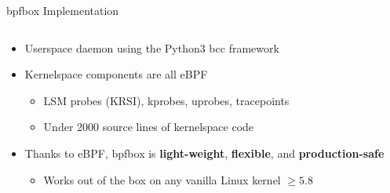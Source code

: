 \documentclass[12pt, dvipsnames, aspectratio=169]{beamer}
\begin{document}



\begin{frame}[c]{bpfbox Implementation}
\begin{columns}
    \begin{column}{0.66\textwidth}
        \begin{itemize}
            \item Userspace daemon using the Python3 bcc framework
            \vspace{2em}
            \item Kernelspace components are all eBPF
            \begin{itemize}
                \item LSM probes (KRSI), kprobes, uprobes, tracepoints
                \item Under 2000 source lines of kernelspace code
            \end{itemize}
            \vspace{2em}
            \item Thanks to eBPF, bpfbox is \textbf{light-weight}, \textbf{flexible}, and \textbf{production-safe}
            \begin{itemize}
                \item Works out of the box on any vanilla Linux kernel $\ge 5.8$
            \end{itemize}
        \end{itemize}
    \end{column}
    \begin{column}{0.33\textwidth}
        \begin{center}
            \color{black}

\end{center}
\end{column}
\end{columns}
\end{frame}
\end{document}
